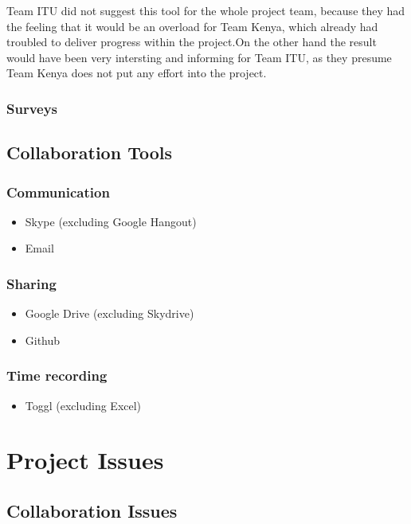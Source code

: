 Team ITU did not suggest this tool for the whole project team, because they had the feeling that it would be an overload for Team Kenya, which already had troubled to deliver progress within the project.On the other hand the result would have been very intersting and informing for Team ITU, as they presume Team Kenya does not put any effort into the project.

\subsubsection {Surveys}


\subsection{Collaboration Tools}

\subsubsection {Communication}
	\begin{itemize}
		\item Skype (excluding Google Hangout)
		\item Email
	\end{itemize}
\subsubsection {Sharing}
	\begin{itemize}
		\item Google Drive (excluding Skydrive)
		\item Github
	\end{itemize}
\subsubsection {Time recording}
\label{sec:timeRecTool}
	\begin{itemize}
		\item Toggl (excluding Excel)
	\end{itemize}



\section{Project Issues}

\subsection{Collaboration Issues}

